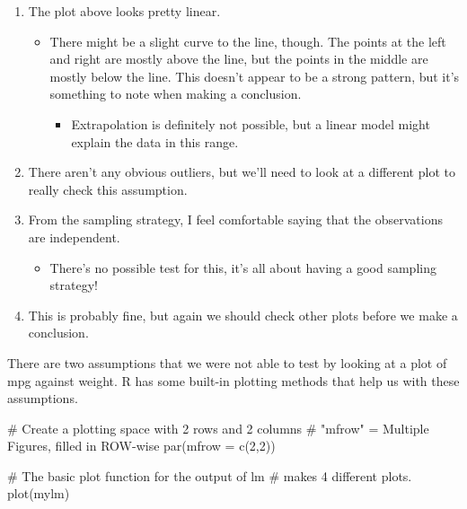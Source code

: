 \documentclass[
  letterpaper,
  DIV=11,
  numbers=noendperiod,
  oneside]{scrreprt}
\newenvironment{Shaded}{\begin{snugshade}}{\end{snugshade}}
\newcommand{\AttributeTok}[1]{\textcolor[rgb]{0.40,0.45,0.13}{#1}}
\newcommand{\CommentTok}[1]{\textcolor[rgb]{0.37,0.37,0.37}{#1}}
\newcommand{\DecValTok}[1]{\textcolor[rgb]{0.68,0.00,0.00}{#1}}
\newcommand{\FunctionTok}[1]{\textcolor[rgb]{0.28,0.35,0.67}{#1}}
\newcommand{\NormalTok}[1]{\textcolor[rgb]{0.00,0.23,0.31}{#1}}
\providecommand{\tightlist}{%
  \setlength{\itemsep}{0pt}\setlength{\parskip}{0pt}}\usepackage{longtable,booktabs,array}
\begin{document}
\begin{enumerate}
\def\labelenumi{\arabic{enumi}.}
\tightlist
\item
  The plot above looks pretty linear.

  \begin{itemize}
  \tightlist
  \item
    There might be a slight curve to the line, though. The points at the
    left and right are mostly above the line, but the points in the
    middle are mostly below the line. This doesn't appear to be a strong
    pattern, but it's something to note when making a conclusion.

    \begin{itemize}
    \tightlist
    \item
      Extrapolation is definitely not possible, but a linear model might
      explain the data in this range.
    \end{itemize}
  \end{itemize}
\item
  There aren't any obvious outliers, but we'll need to look at a
  different plot to really check this assumption.
\item
  From the sampling strategy, I feel comfortable saying that the
  observations are independent.

  \begin{itemize}
  \tightlist
  \item
    There's no possible test for this, it's all about having a good
    sampling strategy!
  \end{itemize}
\item
  This is probably fine, but again we should check other plots before we
  make a conclusion.
\end{enumerate}

There are two assumptions that we were not able to test by looking at a
plot of mpg against weight. R has some built-in plotting methods that
help us with these assumptions.

\begin{Shaded}
\begin{Highlighting}[]
\CommentTok{\# Create a plotting space with 2 rows and 2 columns}
\CommentTok{\# "mfrow" = Multiple Figures, filled in ROW{-}wise}
\FunctionTok{par}\NormalTok{(}\AttributeTok{mfrow =} \FunctionTok{c}\NormalTok{(}\DecValTok{2}\NormalTok{,}\DecValTok{2}\NormalTok{))}

\CommentTok{\# The basic plot function for the output of lm}
\CommentTok{\# makes 4 different plots.}
\FunctionTok{plot}\NormalTok{(mylm)}
\end{Highlighting}
\end{Shaded}
\end{document}

